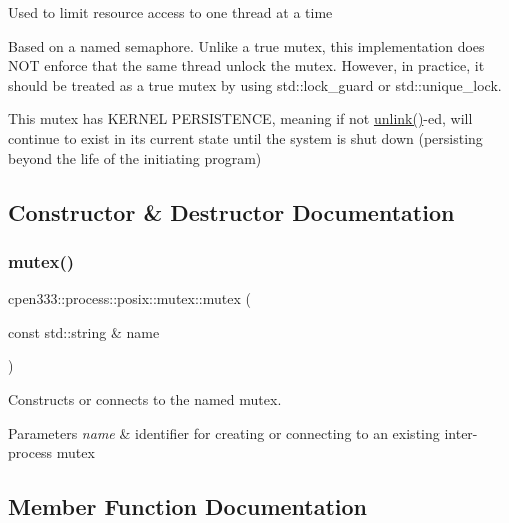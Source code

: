 Used to limit resource access to one thread at a time

Based on a named semaphore. Unlike a true mutex, this implementation does N\+OT enforce that the same thread unlock the mutex. However, in practice, it should be treated as a true mutex by using std\+::lock\+\_\+guard or std\+::unique\+\_\+lock.

This mutex has K\+E\+R\+N\+EL P\+E\+R\+S\+I\+S\+T\+E\+N\+CE, meaning if not \hyperlink{classcpen333_1_1process_1_1posix_1_1mutex_ac1bcf9576d7470e5d64e17876c9cdb36}{unlink()}-\/ed, will continue to exist in its current state until the system is shut down (persisting beyond the life of the initiating program) 

\subsection{Constructor \& Destructor Documentation}
\mbox{\label{classcpen333_1_1process_1_1posix_1_1mutex_a72ecaf79b2e4ea585b542dc0ed240614}} 
\subsubsection{\texorpdfstring{mutex()}{mutex()}}
{\footnotesize\ttfamily cpen333\+::process\+::posix\+::mutex\+::mutex (\begin{DoxyParamCaption}\item[{const std\+::string \&}]{name }\end{DoxyParamCaption})\hspace{0.3cm}{\ttfamily [inline]}}



Constructs or connects to the named mutex. 


\begin{DoxyParams}{Parameters}
{\em name} & identifier for creating or connecting to an existing inter-\/process mutex \\
\hline
\end{DoxyParams}


\subsection{Member Function Documentation}
\mbox{\label{classcpen333_1_1process_1_1posix_1_1mutex_a07dccda80dc88292fa490ce47dd0faa6}} 
